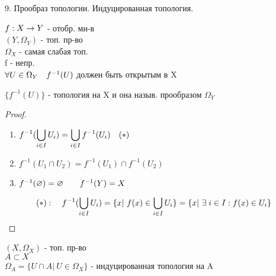 \documentclass[11pt, fleqn]{article}
\begin{document}
    \begin{question}{9. Прообраз топологии. Индуцированная топология.}
        \begin{definition}
            $f: X \rightarrow Y$ - отобр. мн-в\\
            $(Y, \Omega_Y)$ - топ. пр-во\\
            $\Omega_X$ - самая слабая топ.\\
            f - непр.\\
            $\forall U \in \Omega_Y \quad f^{-1}(U)$ должен быть открытым в X
        \end{definition}
        \begin{theorem}
            $\{f^{-1}(U)\}$ - топология на X и она назыв. прообразом $\Omega_Y$
        \end{theorem}

        \begin{proof}
            \begin{enumerate}
                \item $\displaystyle f^{-1}(\bigcup_{i \in I} U_i) = \bigcup_{i \in I} f^{-1}(U_i) \quad (*)$
                \item $f^{-1}(U_1 \cap U_2) = f^{-1}(U_1) \cap f^{-1}(U_2)$
                \item $f^{-1}(\varnothing) = \varnothing \quad\quad f^{-1}(Y) = X$
            \end{enumerate}
            \[(*): \quad f^{-1}(\bigcup_{i \in I} U_i) = \{x | \ f(x) \in \bigcup_{i \in I} U_i\} =
            \{x | \ \exists \; i \in I: f(x) \in U_i\}\]
        \end{proof}

        \begin{definition}
            $(X, \Omega_X)$ - топ. пр-во\\
            $A \subset X$\\
            $\Omega_A = \{U \cap A | \ U \in \Omega_X\}$ - индуцированная топология на A
        \end{definition}
    \end{question}
\end{document}
